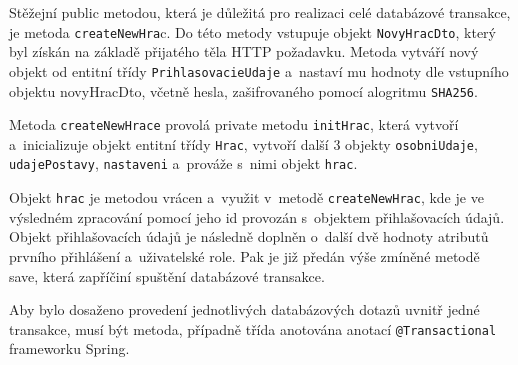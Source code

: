 \documentclass[12pt]{article}
\begin{document}
Stěžejní public metodou, která je důležitá pro realizaci celé databázové transakce, je metoda \texttt{createNewHra}c. Do této metody vstupuje objekt \texttt{NovyHracDto}, který byl získán na základě přijatého těla HTTP požadavku. Metoda vytváří nový objekt od entitní třídy \texttt{PrihlasovacieUdaje} a~nastaví mu hodnoty dle vstupního objektu novyHracDto, včetně hesla, zašifrovaného pomocí alogritmu \texttt{SHA256}. 

Metoda \texttt{createNewHrace} provolá private metodu \texttt{initHrac}, která vytvoří a~inicializuje objekt entitní třídy \texttt{Hrac}, vytvoří další 3 objekty \texttt{osobniUdaje}, \texttt{udajePostavy}, \texttt{nastaveni} a~prováže s~nimi objekt \texttt{hrac}. 

Objekt \texttt{hrac} je metodou vrácen a~využit v~metodě \texttt{createNewHrac}, kde je ve výsledném zpracování pomocí jeho id provozán s~objektem přihlašovacích údajů. Objekt přihlašovacích údajů je následně doplněn o~další dvě hodnoty atributů prvního přihlášení a~uživatelské role. Pak je již předán výše zmíněné metodě save, která zapříčiní spuštění databázové transakce. 

Aby bylo dosaženo provedení jednotlivých databázových dotazů uvnitř jedné transakce,
musí být metoda, případně třída anotována anotací \texttt{@Transactional} frameworku Spring. 


\clearpage
\end{document}
